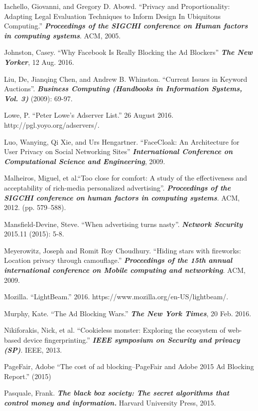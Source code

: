 \documentclass[conference]{IEEEtran}
\begin{document}
\begin{thebibliography}{99}
 Iachello, Giovanni, and Gregory D. Abowd. “Privacy and Proportionality: Adapting Legal Evaluation Techniques to Inform Design In Ubiquitous Computing.” \textbf{\textit{Proceedings of the SIGCHI conference on Human factors in computing systems}}. ACM, 2005.

 Johnston, Casey. “Why Facebook Is Really Blocking the Ad Blockers” \textbf{\textit{The New Yorker}}, 12 Aug. 2016.

 Liu, De, Jianqing Chen, and Andrew B. Whinston. “Current Issues in Keyword Auctions”. \textbf{\textit{Business Computing (Handbooks in Information Systems, Vol. 3)}} (2009): 69-97.

 Lowe, P. “Peter Lowe's Adserver List.” 26 August 2016. http://pgl.yoyo.org/adservers/.

 Luo, Wanying, Qi Xie, and Urs Hengartner. “FaceCloak: An Architecture for User Privacy on Social Networking Sites” \textbf{\textit{International Conference on Computational Science and Engineering}}, 2009.

 Malheiros, Miguel, et al.“Too close for comfort: A study of the effectiveness and acceptability of rich-media personalized advertising”. \textbf{\textit{Proceedings of the SIGCHI conference on human factors in computing systems}}. ACM, 2012. (pp. 579–588).

 Mansfield-Devine, Steve. “When advertising turns nasty”. \textbf{\textit{Network Security}} 2015.11 (2015): 5-8.

 Meyerowitz, Joseph and Romit Roy Choudhury. “Hiding stars with fireworks: Location privacy through camouflage.” \textbf{\textit{Proceedings of the 15th annual international conference on Mobile computing and networking}}. ACM, 2009.

 Mozilla. “LightBeam.” 2016. https://www.mozilla.org/en-US/lightbeam/.

 Murphy, Kate. “The Ad Blocking Wars.” \textbf{\textit{The New York Times}}, 20 Feb. 2016.

 Nikiforakis, Nick, et al. “Cookieless monster: Exploring the ecosystem of web-based device fingerprinting.” \textbf{\textit{IEEE symposium on Security and privacy (SP)}}. IEEE, 2013.

 PageFair, Adobe “The cost of ad blocking–PageFair and Adobe 2015 Ad Blocking Report.” (2015)

 Pasquale, Frank. \textbf{\textit{The black box society: The secret algorithms that control money and information.}} Harvard University Press, 2015.


\end{thebibliography}
\end{document}
